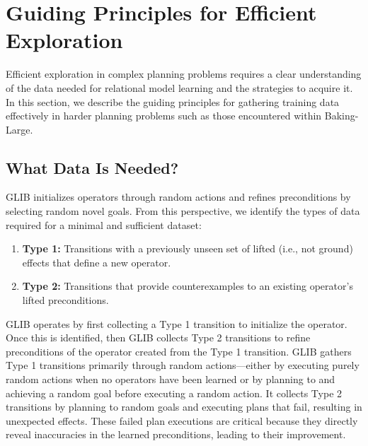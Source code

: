 \section{Guiding Principles for Efficient Exploration}
\label{sec:method}

Efficient exploration in complex planning problems requires a clear understanding of the data needed for relational model learning and the strategies to acquire it. In this section, we describe the guiding principles for gathering training data effectively in harder planning problems such as those encountered within Baking-Large.

\subsection{What Data Is Needed?}
GLIB initializes operators through random actions and refines preconditions by selecting random novel goals. From this perspective, we identify the types of data required for a minimal and sufficient dataset:

\begin{enumerate}
    \item \textbf{Type 1: } Transitions with a previously unseen set of lifted (i.e., not ground) effects that define a new operator. %
    \item \textbf{Type 2: } Transitions that provide counterexamples to an existing operator’s lifted preconditions. %
\end{enumerate}

 GLIB operates by first collecting a Type 1 transition to initialize the operator. Once this is identified, then GLIB collects Type 2 transitions to refine preconditions of the operator created from the Type 1 transition. 
GLIB gathers Type 1 transitions primarily through random actions—either by executing purely random actions when no operators have been learned or by planning to and achieving a random goal before executing a random action. It collects Type 2 transitions by planning to random goals and executing plans that fail, resulting in unexpected effects. These failed plan executions are critical because they directly reveal inaccuracies in the learned preconditions, leading to their improvement.

